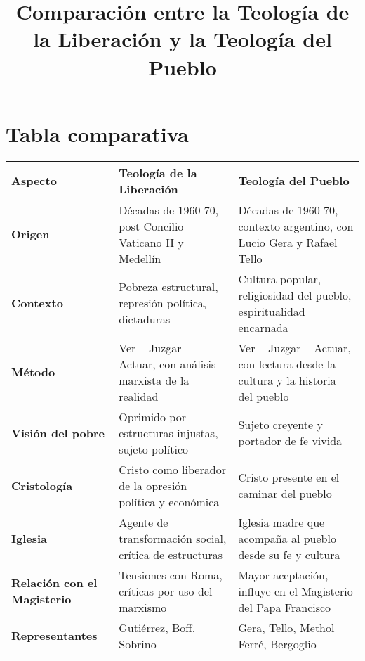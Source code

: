 \documentclass[12pt]{article}
\title{\textbf{Comparación entre la Teología de la Liberación y la Teología del Pueblo}}
\author{}
\date{}
\begin{document}
\maketitle

\section*{Tabla comparativa}

\renewcommand{\arraystretch}{1.5}
\begin{tabular}{>{\raggedright\arraybackslash}p{4cm} >{\raggedright\arraybackslash}p{6cm} >{\raggedright\arraybackslash}p{6cm}}
\toprule
\textbf{Aspecto} & \textbf{Teología de la Liberación} & \textbf{Teología del Pueblo} \\
\midrule
\textbf{Origen} & Décadas de 1960-70, post Concilio Vaticano II y Medellín & Décadas de 1960-70, contexto argentino, con Lucio Gera y Rafael Tello \\
\textbf{Contexto} & Pobreza estructural, represión política, dictaduras & Cultura popular, religiosidad del pueblo, espiritualidad encarnada \\
\textbf{Método} & Ver – Juzgar – Actuar, con análisis marxista de la realidad & Ver – Juzgar – Actuar, con lectura desde la cultura y la historia del pueblo \\
\textbf{Visión del pobre} & Oprimido por estructuras injustas, sujeto político & Sujeto creyente y portador de fe vivida \\
\textbf{Cristología} & Cristo como liberador de la opresión política y económica & Cristo presente en el caminar del pueblo \\
\textbf{Iglesia} & Agente de transformación social, crítica de estructuras & Iglesia madre que acompaña al pueblo desde su fe y cultura \\
\textbf{Relación con el Magisterio} & Tensiones con Roma, críticas por uso del marxismo & Mayor aceptación, influye en el Magisterio del Papa Francisco \\
\textbf{Representantes} & Gutiérrez, Boff, Sobrino & Gera, Tello, Methol Ferré, Bergoglio \\
\bottomrule
\end{tabular}
\end{document}
